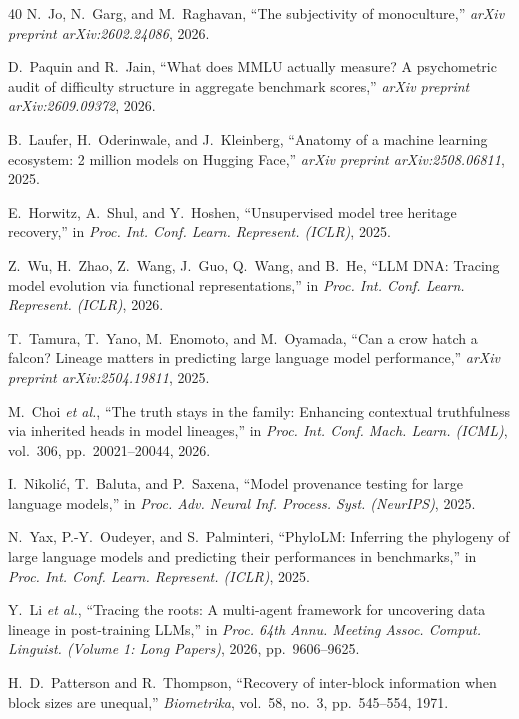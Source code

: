 \documentclass{ieeeaccess}
\theoremstyle{definition}
\theoremstyle{plain}
\begin{document}
\begin{thebibliography}{40}
 N.~Jo, N.~Garg, and M.~Raghavan, ``The subjectivity of
monoculture,'' \emph{arXiv preprint arXiv:2602.24086}, 2026.

 D.~Paquin and R.~Jain, ``What does MMLU actually measure? A
psychometric audit of difficulty structure in aggregate benchmark scores,''
\emph{arXiv preprint arXiv:2609.09372}, 2026.

 B.~Laufer, H.~Oderinwale, and J.~Kleinberg, ``Anatomy of a
machine learning ecosystem: 2 million models on Hugging Face,'' \emph{arXiv
preprint arXiv:2508.06811}, 2025.

 E.~Horwitz, A.~Shul, and Y.~Hoshen, ``Unsupervised model
tree heritage recovery,'' in \emph{Proc. Int. Conf. Learn. Represent. (ICLR)},
2025.

 Z.~Wu, H.~Zhao, Z.~Wang, J.~Guo, Q.~Wang, and B.~He, ``LLM
DNA: Tracing model evolution via functional representations,'' in \emph{Proc.
Int. Conf. Learn. Represent. (ICLR)}, 2026.

 T.~Tamura, T.~Yano, M.~Enomoto, and M.~Oyamada, ``Can a crow
hatch a falcon? Lineage matters in predicting large language model
performance,'' \emph{arXiv preprint arXiv:2504.19811}, 2025.

 M.~Choi \emph{et al.}, ``The truth stays in the family:
Enhancing contextual truthfulness via inherited heads in model lineages,''
in \emph{Proc. Int. Conf. Mach. Learn. (ICML)}, vol.~306, pp.~20021--20044, 2026.

 I.~Nikoli\'c, T.~Baluta, and P.~Saxena, ``Model provenance
testing for large language models,'' in \emph{Proc. Adv. Neural Inf. Process.
Syst. (NeurIPS)}, 2025.

 N.~Yax, P.-Y.~Oudeyer, and S.~Palminteri, ``PhyloLM:
Inferring the phylogeny of large language models and predicting their
performances in benchmarks,'' in \emph{Proc. Int. Conf. Learn. Represent.
(ICLR)}, 2025.

 Y.~Li \emph{et al.}, ``Tracing the roots: A multi-agent
framework for uncovering data lineage in post-training LLMs,'' in \emph{Proc.
64th Annu. Meeting Assoc. Comput. Linguist. (Volume 1: Long Papers)}, 2026,
pp.~9606--9625.

 H.~D.~Patterson and R.~Thompson, ``Recovery of
inter-block information when block sizes are unequal,'' \emph{Biometrika},
vol.~58, no.~3, pp.~545--554, 1971.


\end{thebibliography}
\end{document}
